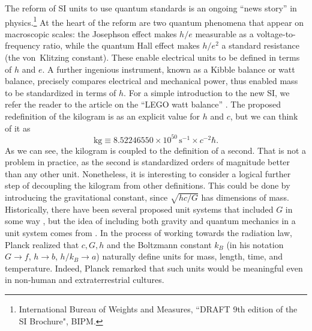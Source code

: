 \documentclass[onecolumn]{aa} %
\begin{document}
The reform of SI units to use quantum standards is an ongoing ``news
story'' in physics.\footnote{International Bureau of Weights and
  Measures, ``DRAFT 9th edition of the SI Brochure", BIPM.}  At the
heart of the reform are two quantum phenomena that appear on
macroscopic scales: the Josephson effect makes $h/e$ measurable as a
voltage-to-frequency ratio, while the quantum Hall effect makes
$h/e^2$ a standard resistance (the von~Klitzing constant).  These
enable electrical units to be defined in terms of $h$ and $e$.  A
further ingenious instrument, known as a Kibble balance or watt
balance, precisely compares electrical and mechanical power, thus
enabled mass to be standardized in terms of $h$.  For a simple
introduction to the new SI, we refer the reader to the article on the
``LEGO watt balance'' \citep{Chao15}. The proposed redefinition of the
kilogram is as an explicit value for $h$ and $c$, but we can think of
it as
\begin{equation}
\mathrm{kg} \equiv 8.52246550 \times 10^{50} \, \mathrm{s}^{-1}
                   \times c^{-2} \hbar .
\end{equation}
As we can see, the kilogram is coupled to the definition of a second.
That is not a problem in practice, as the second is standardized
orders of magnitude better than any other unit.  Nonetheless, it is
interesting to consider a logical further step of decoupling the
kilogram from other definitions.  This could be done by introducing
the gravitational constant, since $\sqrt{hc/G}$ has dimensions of
mass.  Historically, there have been several proposed unit systems
that included $G$ in some way \citep[for a review,
  see][]{Tomilin1999}, but the idea of including both gravity and
quantum mechanics in a unit system comes from \cite{Planck99}. In the
process of working towards the radiation law, Planck realized that
$c,G,h$ and the Boltzmann constant $k_B$ (in his notation
$G\rightarrow f$, $h\rightarrow b$, $h/k_B\rightarrow a$) naturally
define units for mass, length, time, and temperature.  Indeed, Planck
remarked that such units would be meaningful even in non-human and
extraterrestrial cultures.
\end{document}
